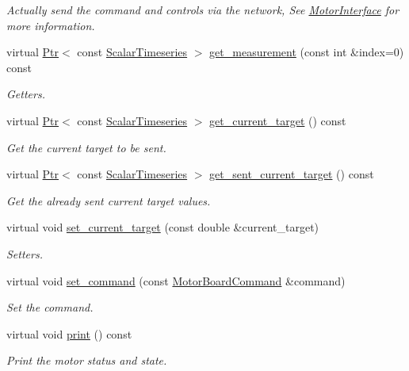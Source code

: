 \begin{DoxyCompactItemize}
\begin{DoxyCompactList}\small\item\em Actually send the command and controls via the network, See \hyperlink{classblmc__drivers_1_1MotorInterface}{Motor\+Interface} for more information. \end{DoxyCompactList}\item 
virtual \hyperlink{classblmc__drivers_1_1MotorInterface_ae31f230b9da3674a05543023c90b124c}{Ptr}$<$ const \hyperlink{classblmc__drivers_1_1MotorInterface_a49b8fc916b9f9debbd7b0988463db5cd}{Scalar\+Timeseries} $>$ \hyperlink{classblmc__drivers_1_1Motor_a919cb2f48cfc8550fabd5d3c5d7d0cf0}{get\+\_\+measurement} (const int \&index=0) const 
\begin{DoxyCompactList}\small\item\em Getters. \end{DoxyCompactList}\item 
virtual \hyperlink{classblmc__drivers_1_1MotorInterface_ae31f230b9da3674a05543023c90b124c}{Ptr}$<$ const \hyperlink{classblmc__drivers_1_1MotorInterface_a49b8fc916b9f9debbd7b0988463db5cd}{Scalar\+Timeseries} $>$ \hyperlink{classblmc__drivers_1_1Motor_ac1c0c4f1faa125bc0b245fdbe2590575}{get\+\_\+current\+\_\+target} () const 
\begin{DoxyCompactList}\small\item\em Get the current target to be sent. \end{DoxyCompactList}\item 
virtual \hyperlink{classblmc__drivers_1_1MotorInterface_ae31f230b9da3674a05543023c90b124c}{Ptr}$<$ const \hyperlink{classblmc__drivers_1_1MotorInterface_a49b8fc916b9f9debbd7b0988463db5cd}{Scalar\+Timeseries} $>$ \hyperlink{classblmc__drivers_1_1Motor_aa629114982c99453b4563a0ec06b9eea}{get\+\_\+sent\+\_\+current\+\_\+target} () const 
\begin{DoxyCompactList}\small\item\em Get the already sent current target values. \end{DoxyCompactList}\item 
virtual void \hyperlink{classblmc__drivers_1_1Motor_a48801c9858a7b1784b0a0ac4272fdaf5}{set\+\_\+current\+\_\+target} (const double \&current\+\_\+target)
\begin{DoxyCompactList}\small\item\em Setters. \end{DoxyCompactList}\item 
virtual void \hyperlink{classblmc__drivers_1_1Motor_a4af56df5466d011fc2a567dd815a6c1b}{set\+\_\+command} (const \hyperlink{classblmc__drivers_1_1MotorBoardCommand}{Motor\+Board\+Command} \&command)
\begin{DoxyCompactList}\small\item\em Set the command. \end{DoxyCompactList}\item 
virtual void \hyperlink{classblmc__drivers_1_1Motor_a26d75604f92c85ba127d690d0b7fdd59}{print} () const 
\begin{DoxyCompactList}\small\item\em Print the motor status and state. \end{DoxyCompactList}\end{DoxyCompactItemize}
